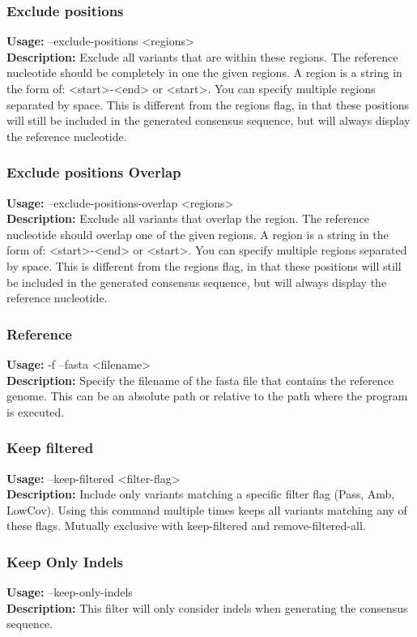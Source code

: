 \subsubsection{Exclude positions}
\textbf{Usage:} --exclude-positions <regions>\\	
\textbf{Description:} Exclude all variants that are within these regions. The reference nucleotide should be completely in one the given regions. A region is a string in the form of: <start>-<end> or <start>. You can specify multiple regions separated by space. 
This is different from the regions flag, in that these positions will still be included in the generated consensus sequence, but will always display the reference nucleotide.

\subsubsection{Exclude positions Overlap}
\textbf{Usage:} --exclude-positions-overlap <regions>	\\
\textbf{Description:} Exclude all variants that overlap the region. The reference nucleotide should overlap one of the given regions. A region is a string in the form of: <start>-<end> or <start>. You can specify multiple regions separated by space. This is different from the regions flag, in that these positions will still be included in the generated consensus sequence, but will always display the reference nucleotide.

\subsubsection{Reference}
\textbf{Usage:} -f --fasta <filename>\\
\textbf{Description:} Specify the filename of the fasta file that contains the reference genome. This can be an absolute path or relative to the path where the program is executed.

\subsubsection{Keep filtered}
\textbf{Usage:} --keep-filtered <filter-flag>\\
\textbf{Description:} Include only variants matching a specific filter flag (Pass, Amb, LowCov). Using this command multiple times keeps all variants matching any of these flags. Mutually exclusive with keep-filtered and remove-filtered-all.

\subsubsection{Keep Only Indels}
\textbf{Usage:} --keep-only-indels \\
\textbf{Description:}  This filter will only consider                                        indels when generating the consensus sequence.



